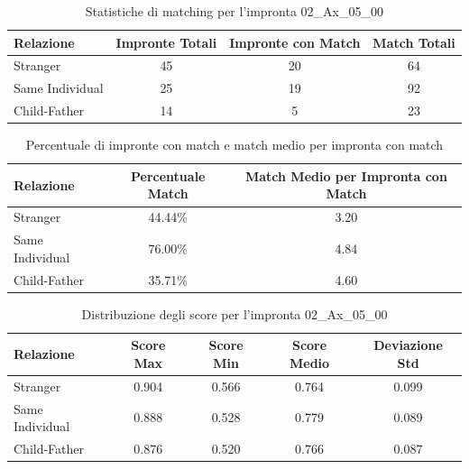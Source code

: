 \begin{table}[htbp]
\centering
\caption{Statistiche di matching per l'impronta 02\_Ax\_05\_00}
\label{tab:results_02_Ax_05_00}
\begin{tabular}{|l|c|c|c|}
\hline
\textbf{Relazione} & \textbf{Impronte Totali} & \textbf{Impronte con Match} & \textbf{Match Totali} \\
\hline
Stranger & 45 & 20 & 64 \\
\hline
Same Individual & 25 & 19 & 92 \\
\hline
Child-Father & 14 & 5 & 23 \\
\hline
\end{tabular}
\end{table}


\begin{table}[htbp]
\centering
\caption{Percentuale di impronte con match e match medio per impronta con match}
\label{tab:match_percentage_02_Ax_05_00}
\begin{tabular}{|l|c|c|}
\hline
\textbf{Relazione} & \textbf{Percentuale Match} & \textbf{Match Medio per Impronta con Match} \\
\hline
Stranger & 44.44\% & 3.20 \\
\hline
Same Individual & 76.00\% & 4.84 \\
\hline
Child-Father & 35.71\% & 4.60 \\
\hline
\end{tabular}
\end{table}


\begin{table}[htbp]
\centering
\caption{Distribuzione degli score per l'impronta 02\_Ax\_05\_00}
\label{tab:scores_02_Ax_05_00}
\begin{tabular}{|l|c|c|c|c|}
\hline
\textbf{Relazione} & \textbf{Score Max} & \textbf{Score Min} & \textbf{Score Medio} & \textbf{Deviazione Std} \\
\hline
Stranger & 0.904 & 0.566 & 0.764 & 0.099 \\
\hline
Same Individual & 0.888 & 0.528 & 0.779 & 0.089 \\
\hline
Child-Father & 0.876 & 0.520 & 0.766 & 0.087 \\
\hline
\end{tabular}
\end{table}

